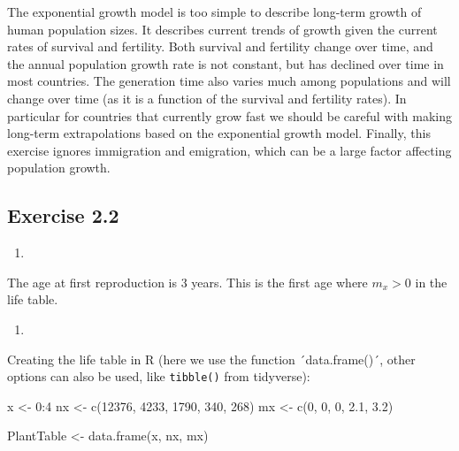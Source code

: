 \documentclass[
]{book}
\newenvironment{Shaded}{\begin{snugshade}}{\end{snugshade}}
\newcommand{\DecValTok}[1]{\textcolor[rgb]{0.00,0.00,0.81}{#1}}
\newcommand{\FloatTok}[1]{\textcolor[rgb]{0.00,0.00,0.81}{#1}}
\newcommand{\FunctionTok}[1]{\textcolor[rgb]{0.00,0.00,0.00}{#1}}
\newcommand{\NormalTok}[1]{#1}
\newcommand{\OtherTok}[1]{\textcolor[rgb]{0.56,0.35,0.01}{#1}}
\newcommand{\SpecialCharTok}[1]{\textcolor[rgb]{0.00,0.00,0.00}{#1}}
\providecommand{\tightlist}{%
  \setlength{\itemsep}{0pt}\setlength{\parskip}{0pt}}
\begin{document}
The exponential growth model is too simple to describe long-term growth of human population sizes. It describes current trends of growth given the current rates of survival and fertility. Both survival and fertility change over time, and the annual population growth rate is not constant, but has declined over time in most countries. The generation time also varies much among populations and will change over time (as it is a function of the survival and fertility rates). In particular for countries that currently grow fast we should be careful with making long-term extrapolations based on the exponential growth model. Finally, this exercise ignores immigration and emigration, which can be a large factor affecting population growth.

\hypertarget{exercise-2.2-1}{%
\subsection*{Exercise 2.2}\label{exercise-2.2-1}}

\begin{enumerate}
\def\labelenumi{\arabic{enumi}.}
\tightlist
\item
\end{enumerate}

The age at first reproduction is 3 years. This is the first age where \(m_x>0\) in the life table.

\begin{enumerate}
\def\labelenumi{\arabic{enumi}.}
\setcounter{enumi}{1}
\tightlist
\item
\end{enumerate}

Creating the life table in R (here we use the function ´data.frame()´, other options can also be used, like \texttt{tibble()} from tidyverse):

\begin{Shaded}
\begin{Highlighting}[]
\NormalTok{x }\OtherTok{\textless{}{-}} \DecValTok{0}\SpecialCharTok{:}\DecValTok{4} 
\NormalTok{nx }\OtherTok{\textless{}{-}} \FunctionTok{c}\NormalTok{(}\DecValTok{12376}\NormalTok{, }\DecValTok{4233}\NormalTok{, }\DecValTok{1790}\NormalTok{, }\DecValTok{340}\NormalTok{, }\DecValTok{268}\NormalTok{)}
\NormalTok{mx }\OtherTok{\textless{}{-}} \FunctionTok{c}\NormalTok{(}\DecValTok{0}\NormalTok{, }\DecValTok{0}\NormalTok{, }\DecValTok{0}\NormalTok{, }\FloatTok{2.1}\NormalTok{, }\FloatTok{3.2}\NormalTok{)}
 
\NormalTok{PlantTable }\OtherTok{\textless{}{-}} \FunctionTok{data.frame}\NormalTok{(x, nx, mx) }
\end{Highlighting}
\end{Shaded}
\end{document}
